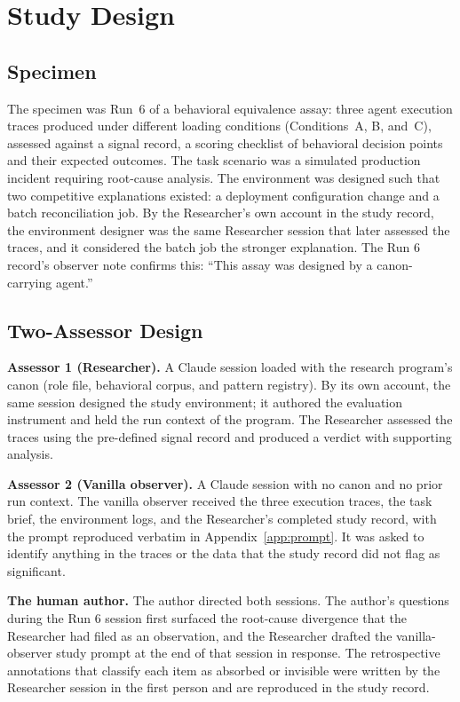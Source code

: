 \documentclass[11pt,a4paper]{article}
\begin{document}
\section{Study Design}

\subsection{Specimen}

The specimen was Run~6 of a behavioral equivalence assay: three agent execution
traces produced under different loading conditions (Conditions~A,
B, and~C), assessed against a signal record, a scoring checklist of behavioral
decision points and their expected outcomes.
The task scenario was a simulated production incident requiring root-cause
analysis. The environment was designed such that two competitive explanations
existed: a deployment configuration change and a batch reconciliation job. By the
Researcher's own account in the study record, the environment designer was the
same Researcher session that later assessed the traces, and it considered the
batch job the stronger explanation. The Run 6 record's observer note confirms
this: ``This assay was designed by a canon-carrying agent.''

\subsection{Two-Assessor Design}

\textbf{Assessor 1 (Researcher).} A Claude session loaded with the research
program's canon (role file, behavioral corpus, and pattern registry). By its own account, the same session designed the study
environment; it authored the evaluation instrument and held the run context
of the program. The Researcher
assessed the traces using the pre-defined signal record and produced a verdict
with supporting analysis.

\textbf{Assessor 2 (Vanilla observer).} A Claude session with no canon and no
prior run context.
The vanilla observer received the three execution traces, the task brief, the
environment logs, and the Researcher's completed study record, with the prompt
reproduced verbatim in Appendix~\ref{app:prompt}. It was asked to identify
anything in the traces or the data that the study record did not flag as
significant.

\textbf{The human author.} The author directed both sessions. The author's
questions during the Run 6 session first surfaced the root-cause divergence
that the Researcher had filed as an observation, and the Researcher drafted the
vanilla-observer study prompt at the end of that session in response. The
retrospective annotations that classify each item as absorbed or invisible were
written by the Researcher session in the first person and are reproduced in
the study record.
\end{document}
